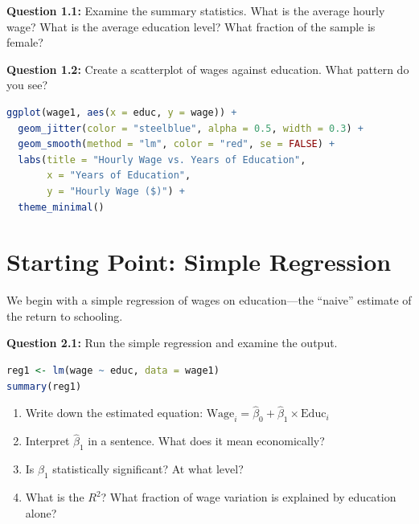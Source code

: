 \documentclass[11pt,letterpaper]{article}
\begin{document}
\vspace{0.5cm}

\textbf{Question 1.1:} Examine the summary statistics. What is the average hourly wage? What is the average education level? What fraction of the sample is female?

\vspace{2cm}

\textbf{Question 1.2:} Create a scatterplot of wages against education. What pattern do you see?

\begin{lstlisting}[language=R]
ggplot(wage1, aes(x = educ, y = wage)) +
  geom_jitter(color = "steelblue", alpha = 0.5, width = 0.3) +
  geom_smooth(method = "lm", color = "red", se = FALSE) +
  labs(title = "Hourly Wage vs. Years of Education",
       x = "Years of Education",
       y = "Hourly Wage ($)") +
  theme_minimal()
\end{lstlisting}

\vspace{2cm}

\newpage

\section{Starting Point: Simple Regression}

We begin with a simple regression of wages on education---the ``naive'' estimate of the return to schooling.

\textbf{Question 2.1:} Run the simple regression and examine the output.

\begin{lstlisting}[language=R]
reg1 <- lm(wage ~ educ, data = wage1)
summary(reg1)
\end{lstlisting}

\begin{enumerate}[label=(\alph*)]
\item Write down the estimated equation: $\widehat{\text{Wage}}_i = \hat{\beta}_0 + \hat{\beta}_1 \times \text{Educ}_i$
\item Interpret $\hat{\beta}_1$ in a sentence. What does it mean economically?
\item Is $\hat{\beta}_1$ statistically significant? At what level?
\item What is the $R^2$? What fraction of wage variation is explained by education alone?
\end{enumerate}
\end{document}
